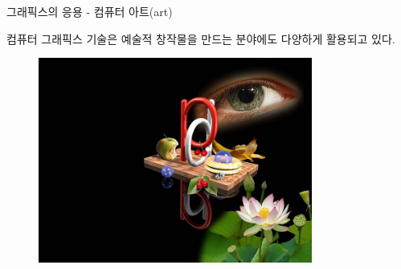 \documentclass{beamer}
\begin{document}
\begin{frame}{그래픽스의 응용 - 컴퓨터 아트(art)}

컴퓨터 그래픽스 기술은 예술적 창작물을 만드는 분야에도 다양하게 활용되고 있다. 

\begin{figure}
    \includegraphics[width=9cm]{OGL_intro/computerArt.jpg}
\end{figure}

\end{frame}
\end{document}
